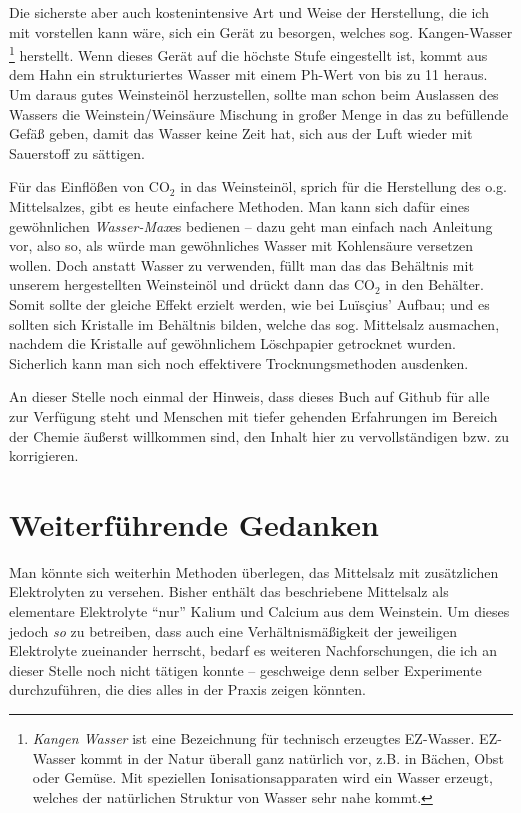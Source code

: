 \documentclass[a5paper,fontsize=10pt]{memoir}
\begin{document}
Die sicherste 
aber auch kostenintensive Art und Weise der Herstellung,
die ich mit vorstellen kann wäre, 
sich ein Gerät zu besorgen, welches sog. Kangen-Wasser%
\footnote{\emph{Kangen Wasser} ist eine Bezeichnung 
für technisch erzeugtes EZ-Wasser. 
EZ-Wasser kommt in der Natur überall ganz natürlich vor, 
z.B. in Bächen, Obst oder Gemüse. 
Mit speziellen Ionisationsapparaten wird ein Wasser erzeugt,
welches der natürlichen Struktur von Wasser sehr nahe kommt.}
herstellt.
Wenn dieses Gerät auf die höchste Stufe eingestellt ist, 
kommt aus dem Hahn ein strukturiertes Wasser 
mit einem Ph-Wert von bis zu 11 heraus. 
Um daraus gutes Weinsteinöl herzustellen, 
sollte man schon beim Auslassen des Wassers 
die Weinstein/Weinsäure Mischung in großer Menge 
in das zu befüllende Gefäß geben, 
damit das Wasser keine Zeit hat, 
sich aus der Luft wieder mit Sauerstoff zu sättigen.


Für das Einflößen von CO$_2$ in das Weinsteinöl, 
sprich für die Herstellung des o.g. Mittelsalzes, 
gibt es heute einfachere Methoden. 
Man kann sich dafür eines gewöhnlichen \emph{Wasser-Max}es bedienen 
-- dazu geht man einfach nach Anleitung vor, 
also so, als würde man gewöhnliches Wasser mit Kohlensäure versetzen wollen. 
Doch anstatt Wasser zu verwenden, 
füllt man das das Behältnis mit unserem hergestellten Weinsteinöl 
und drückt dann das CO$_2$ in den Behälter. 
Somit sollte der gleiche Effekt erzielt werden, wie bei Luïsçius' Aufbau; 
und es sollten sich Kristalle im Behältnis bilden, 
welche das sog. Mittelsalz ausmachen, 
nachdem die Kristalle auf gewöhnlichem Löschpapier getrocknet wurden. 
Sicherlich kann man sich noch effektivere Trocknungsmethoden ausdenken.

An dieser Stelle noch einmal der Hinweis, dass dieses
Buch auf Github für alle zur Verfügung steht und
Menschen mit tiefer gehenden Erfahrungen
im Bereich der Chemie äußerst willkommen sind,
den Inhalt hier zu vervollständigen bzw. zu korrigieren.


\section{Weiterführende Gedanken}

Man könnte sich weiterhin Methoden überlegen, 
das Mittelsalz mit zusätzlichen Elektrolyten zu versehen. 
Bisher enthält das beschriebene Mittelsalz 
als elementare Elektrolyte
``nur'' Kalium und Calcium aus dem Weinstein. 
Um dieses jedoch \emph{so} zu betreiben, 
dass auch eine Verhältnismäßigkeit 
der jeweiligen Elektrolyte zueinander herrscht, 
bedarf es weiteren Nachforschungen, 
die ich an dieser Stelle noch nicht tätigen konnte 
-- geschweige denn selber Experimente durchzuführen, 
die dies alles in der Praxis zeigen könnten.
\end{document}
